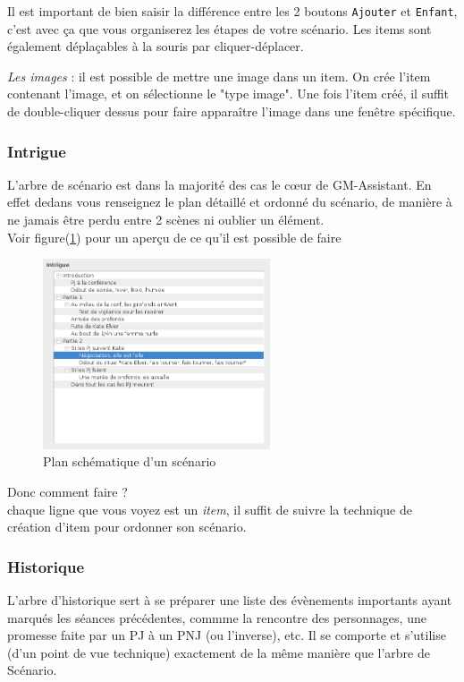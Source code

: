\documentclass[a4paper,12pt]{article}
\newcommand*{\GMA}{GM-Assistant\xspace}
\newcommand*{\interfaceitem}[1]{\texttt{#1}}
\newcommand*{\guillemets}[1]{\og #1\fg{}\xspace}
\begin{document}
Il est important de bien saisir la différence entre les 2 boutons \interfaceitem{Ajouter} et \interfaceitem{Enfant}, c'est avec ça que vous organiserez les étapes de votre scénario.
Les items sont également déplaçables à la souris par \guillemets{cliquer-déplacer}.

\emph{Les images} : il est possible de mettre une image dans un item. On crée l'item contenant l'image, et on sélectionne le "type image". Une fois l'item créé, il suffit de double-cliquer dessus pour faire apparaître l'image dans une fenêtre spécifique.

\subsubsection{Intrigue}\label{scenario}
L'arbre de scénario est dans la majorité des cas le cœur de \GMA. En effet dedans vous renseignez le plan détaillé et ordonné du scénario, de manière à ne jamais être perdu entre 2 scènes ni oublier un élément.
\\
Voir figure(\ref{arbre_scenar}) pour un aperçu de ce qu'il est possible de faire
\begin{figure}[h]
    \includegraphics[width=0.6\textwidth]{scenario_type}
    \caption{Plan schématique d'un scénario}
    \label{arbre_scenar}
\end{figure}
Donc comment faire ?
\\
chaque ligne que vous voyez est un \emph{item}, il suffit de suivre la technique de création d'item pour ordonner son scénario.
\subsubsection{Historique}\label{historique}
L'arbre d'historique sert à se préparer une liste des évènements importants ayant marqués les séances précédentes, commme la rencontre des personnages, une promesse faite par un PJ à un PNJ (ou l'inverse), etc.
Il se comporte et s'utilise (d'un point de vue technique) exactement de la même manière que l'arbre de Scénario.
\end{document}
